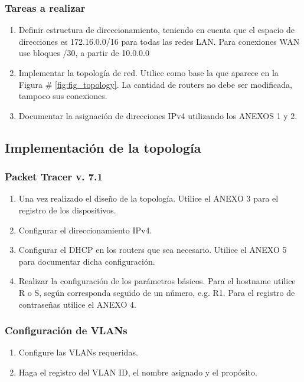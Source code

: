 \documentclass[12pt]{article}
\begin{document}
\subsubsection{Tareas a realizar}
\begin{enumerate}
\item Definir estructura de direccionamiento, teniendo en cuenta que el espacio de direcciones es 172.16.0.0/16 para todas las redes LAN. Para conexiones WAN use bloques /30, a partir de 10.0.0.0
\item Implementar la topología de red. Utilice como base la que aparece en la Figura \# \ref{fig:fig_topology}. La cantidad de routers no debe ser modificada, tampoco sus conexiones.
\item Documentar la asignación de direcciones IPv4 utilizando los ANEXOS 1 y 2.
\end{enumerate}

\subsection{Implementación de la topología}
\subsubsection{Packet Tracer v. 7.1}
\begin{enumerate}
\item Una vez realizado el diseño de la topología. Utilice el ANEXO 3 para el registro de los dispositivos.
\item Configurar el direccionamiento IPv4.
\item Configurar el DHCP en los routers que sea necesario. Utilice el ANEXO 5 para documentar dicha configuración.
\item Realizar la configuración de los parámetros básicos. Para el hostname utilice R o S, según corresponda seguido de un número, e.g. R1. Para el registro de contraseñas utilice el ANEXO 4.
\end{enumerate}

\subsubsection{Configuración de VLANs}
\begin{enumerate}
\item Configure las VLANs requeridas.
\item Haga el registro del VLAN ID, el nombre asignado y el propósito.
\end{enumerate}
\end{document}
